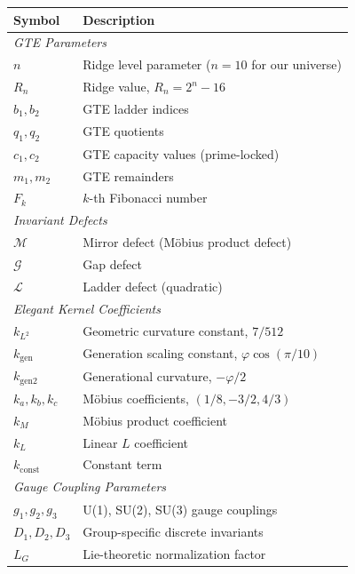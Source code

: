 \documentclass[11pt,twocolumn]{article}
\newcommand{\M}{\mathcal{M}}
\newcommand{\G}{\mathcal{G}}
\newcommand{\LL}{\mathcal{L}}
\begin{document}
\begin{table}[h!]
    \centering
    \small
    \renewcommand{\arraystretch}{1.3}
    \begin{tabular}{@{}lp{6.5cm}@{}}
        \toprule
        \textbf{Symbol} & \textbf{Description} \\
        \midrule
        \multicolumn{2}{l}{\textit{GTE Parameters}} \\ 
        $n$ & Ridge level parameter ($n=10$ for our universe) \\
        $R_n$ & Ridge value, $R_n = 2^n - 16$ \\
        $b_1, b_2$ & GTE ladder indices \\
        $q_1, q_2$ & GTE quotients \\
        $c_1, c_2$ & GTE capacity values (prime-locked) \\
        $m_1, m_2$ & GTE remainders \\
        $F_k$ & $k$-th Fibonacci number \\
        \midrule
        \multicolumn{2}{l}{\textit{Invariant Defects}} \\
        $\M$ & Mirror defect (Möbius product defect) \\
        $\G$ & Gap defect \\
        $\LL$ & Ladder defect (quadratic) \\
        \midrule
        \multicolumn{2}{l}{\textit{Elegant Kernel Coefficients}} \\
        $k_{L^2}$ & Geometric curvature constant, $7/512$ \\
        $k_{\text{gen}}$ & Generation scaling constant, $\varphi\cos(\pi/10)$ \\
        $k_{\text{gen2}}$ & Generational curvature, $-\varphi/2$ \\
        $k_a, k_b, k_c$ & Möbius coefficients, $(1/8, -3/2, 4/3)$ \\
        $k_M$ & Möbius product coefficient \\
        $k_L$ & Linear $L$ coefficient \\
        $k_{\text{const}}$ & Constant term \\
        \midrule
        \multicolumn{2}{l}{\textit{Gauge Coupling Parameters}} \\
        $g_1, g_2, g_3$ & U(1), SU(2), SU(3) gauge couplings \\
        $D_1, D_2, D_3$ & Group-specific discrete invariants \\
        $L_G$ & Lie-theoretic normalization factor \\

\end{tabular}
\end{table}
\end{document}
